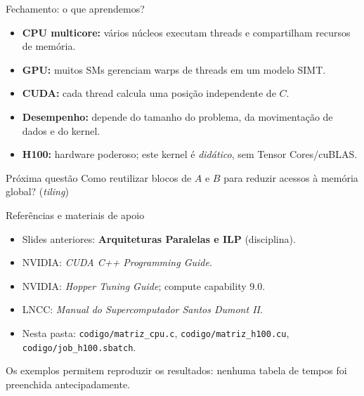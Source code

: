\documentclass[aspectratio=169,11pt]{beamer}
\begin{document}
\begin{frame}{Fechamento: o que aprendemos?}
\begin{itemize}
\item \textbf{CPU multicore:} vários núcleos executam threads e compartilham recursos de memória.
\item \textbf{GPU:} muitos SMs gerenciam warps de threads em um modelo SIMT.
\item \textbf{CUDA:} cada thread calcula uma posição independente de \(C\).
\item \textbf{Desempenho:} depende do tamanho do problema, da movimentação de dados e do kernel.
\item \textbf{H100:} hardware poderoso; este kernel é \emph{didático}, sem Tensor Cores/cuBLAS.
\end{itemize}
\begin{block}{Próxima questão}
Como reutilizar blocos de \(A\) e \(B\) para reduzir acessos à memória global? (\emph{tiling})
\end{block}
\end{frame}

\begin{frame}{Referências e materiais de apoio}
\begin{itemize}
\item Slides anteriores: \textbf{Arquiteturas Paralelas e ILP} (disciplina).
\item NVIDIA: \emph{CUDA C++ Programming Guide}.
\item NVIDIA: \emph{Hopper Tuning Guide}; compute capability 9.0.
\item LNCC: \emph{Manual do Supercomputador Santos Dumont II}.
\item Nesta pasta: \texttt{codigo/matriz\_cpu.c}, \texttt{codigo/matriz\_h100.cu}, \texttt{codigo/job\_h100.sbatch}.
\end{itemize}
\vspace{5mm}
\centering\small Os exemplos permitem reproduzir os resultados: nenhuma tabela de tempos foi preenchida antecipadamente.
\end{frame}
\end{document}
